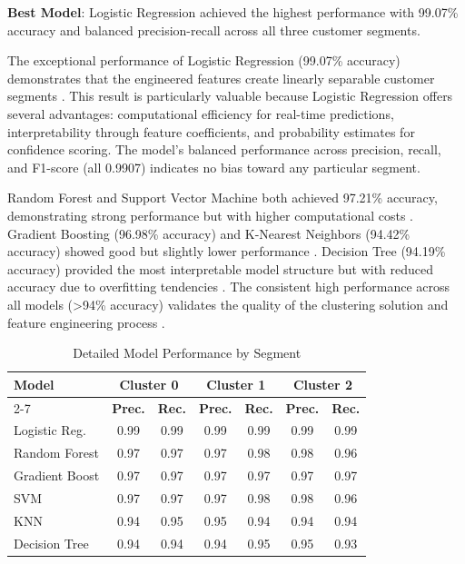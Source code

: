 \documentclass[12pt,a4paper]{report}
\begin{document}
\noindent \textbf{Best Model}: Logistic Regression achieved the highest performance with 99.07\% accuracy and balanced precision-recall across all three customer segments.

\noindent The exceptional performance of Logistic Regression (99.07\% accuracy) demonstrates that the engineered features create linearly separable customer segments \cite{hastie2009}. This result is particularly valuable because Logistic Regression offers several advantages: computational efficiency for real-time predictions, interpretability through feature coefficients, and probability estimates for confidence scoring. The model's balanced performance across precision, recall, and F1-score (all 0.9907) indicates no bias toward any particular segment.


\noindent Random Forest and Support Vector Machine both achieved 97.21\% accuracy, demonstrating strong performance but with higher computational costs \cite{breiman2001, vapnik1995}. Gradient Boosting (96.98\% accuracy) and K-Nearest Neighbors (94.42\% accuracy) showed good but slightly lower performance \cite{chen2016}. Decision Tree (94.19\% accuracy) provided the most interpretable model structure but with reduced accuracy due to overfitting tendencies \cite{hastie2009}. The consistent high performance across all models (>94\% accuracy) validates the quality of the clustering solution and feature engineering process \cite{hughes1994}.


\begin{table}[htbp]
\caption{Detailed Model Performance by Segment}
\label{tab:model_performance_detailed}
\centering
\small
\begin{tabular}{|l|c|c|c|c|c|c|}
\hline
\textbf{Model} & \multicolumn{2}{c|}{\textbf{Cluster 0}} & \multicolumn{2}{c|}{\textbf{Cluster 1}} & \multicolumn{2}{c|}{\textbf{Cluster 2}} \\
\cline{2-7}
 & \textbf{Prec.} & \textbf{Rec.} & \textbf{Prec.} & \textbf{Rec.} & \textbf{Prec.} & \textbf{Rec.} \\
\hline
Logistic Reg. & 0.99 & 0.99 & 0.99 & 0.99 & 0.99 & 0.99 \\
\hline
Random Forest & 0.97 & 0.97 & 0.97 & 0.98 & 0.98 & 0.96 \\
\hline
Gradient Boost & 0.97 & 0.97 & 0.97 & 0.97 & 0.97 & 0.97 \\
\hline
SVM & 0.97 & 0.97 & 0.97 & 0.98 & 0.98 & 0.96 \\
\hline
KNN & 0.94 & 0.95 & 0.95 & 0.94 & 0.94 & 0.94 \\
\hline
Decision Tree & 0.94 & 0.94 & 0.94 & 0.95 & 0.95 & 0.93 \\
\hline
\end{tabular}
\end{table}
\end{document}
